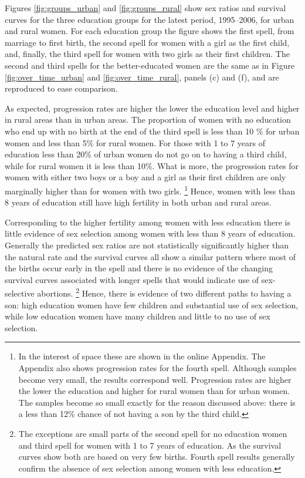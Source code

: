 \documentclass[12pt,letterpaper]{article}
\begin{document}
Figures \ref{fig:groups_urban} and \ref{fig:groups_rural} show sex ratios and
survival curves for the three education groups for the latest period, 1995--2006,
for urban and rural women.
For each education group the figure shows the first spell, from marriage to first
birth, the second spell for women with a girl as the first child, and, finally,
the third spell for women with two girls as their first children.
The second and third spells for the better-educated women are the same as in
Figure \ref{fig:over_time_urban} and \ref{fig:over_time_rural}, panels (c) and (f),
and are reproduced to ease comparison.

As expected, progression rates are higher the lower the education level and higher in
rural areas than in urban areas.
The proportion of women with no education who end up with no birth at the end of the 
third spell is less than 10 \% for urban women and less than 5\% for rural women.
For those with 1 to 7 years of education less than 20\% of urban women do not go on to 
having a third child, while for rural women it is less than 10\%.
What is more, the progression rates for women with either two boys or a boy and a girl
as their first children are only marginally higher than for women with two girls.%
\footnote{
In the interest of space these are shown in the online Appendix. 
The Appendix also shows progression rates for the fourth spell.
Although samples become very small, the results correspond well.
Progression rates are higher the lower the education and higher for rural women than
for urban women.
The samples become so small exactly for the reason discussed above:
there is a less than 12\% chance of not having a son by the third child.
}
Hence, women with less than 8 years of education still have high fertility in both
urban and rural areas.

Corresponding to the higher fertility among women with less education there is little
evidence of sex selection among women with less than 8 years of education.
Generally the predicted sex ratios are not statistically significantly
higher than the natural rate and the survival curves all show a similar pattern where
most of the births occur early in the spell and there is no evidence of the changing
survival curves associated with longer spells that would indicate use of sex-selective 
abortions.%
\footnote{
The exceptions are small parts of the second spell for no education women and 
third spell for women with 1 to 7 years of education. 
As the survival curves show both are based on very few births.
Fourth spell results generally confirm the absence of sex selection among women with 
less education.
}
Hence, there is evidence of two different paths to having a son:
high education women have few children and substantial use of sex selection, while
low education women have many children and little to no use of sex selection.
\end{document}
